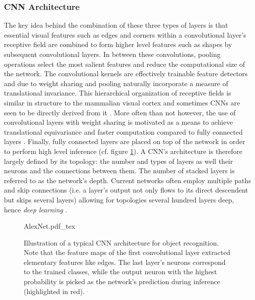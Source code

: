 \subsubsection{CNN Architecture}
The key idea behind the combination of these three types of layers is that essential visual features such as edges and corners within a convolutional layer's receptive field are combined to form higher level features such as shapes by subsequent convolutional layers. In between these convolutions, pooling operations select the most salient features and reduce the computational size of the network. The convolutional kernels are effectively trainable feature detectors and due to weight sharing and pooling naturally incorporate a measure of translational invariance. This hierarchical organization of receptive fields is similar in structure to the mammalian visual cortex \cite{cat-brain} and sometimes CNNs are seen to be directly derived from it \cite{Fukushima1980,lecun2015deep}. More often than not however, the use of convolutional layers with weight sharing is motivated as a means to achieve translational equivariance and faster computation compared to fully connected layers \cite{Goodfellow-et-al-2016,7298668,7298594}. Finally, fully connected layers are placed on top of the network in order to perform high level inference (cf. figure \ref{fig:cnn-arch}). A CNN's architecture is therefore largely defined by its topology: the number and types of layers as well their neurons and the connections between them. The number of stacked layers is referred to as the network's depth. Current networks often employ multiple paths and skip connections (i.e. a layer's output not only flows to its direct descendent but skips several layers) allowing for topologies several hundred layers deep, hence \emph{deep learning} \cite{huang2017densely,szegedy2017inception,xie2017aggregated,wang2015towards}.
\begin{figure}[H]
    \centering
\def\svgwidth{\textwidth}
{AlexNet.pdf_tex}
\caption[Illustration of a typical CNN architecture]{Illustration of a typical CNN architecture for object recognition. Note that the feature maps of the first convolutional layer extracted elementary features like edges. The last layer's neurons correspond to the trained classes, while the output neuron with the highest probability is picked as the network's prediction during inference (highlighted in red).}\label{fig:cnn-arch}
\end{figure}\noindent
